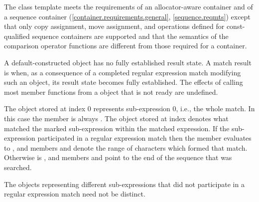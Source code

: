 \pnum
{}%
%
%
The class template  meets the requirements of an
allocator-aware container and of a sequence container
(\ref{container.requirements.general}, \ref{sequence.reqmts})
except that only
copy assignment,
move assignment, and
operations defined for const-qualified sequence containers
are supported and
that the semantics of the comparison operator functions are different from those
required for a container.

\pnum
A default-constructed  object has no fully established result state. A
match result is  when, as a consequence of a completed regular expression match
modifying such an object, its result state becomes fully established. The effects of calling
most member functions from a  object that is not ready are undefined.

\pnum
{}%
The  object stored at index 0 represents sub-expression 0,
i.e., the whole match. In this case the  member
 is always . The 
object stored at index  denotes what matched the marked
sub-expression  within the matched expression. If the
sub-expression  participated in a regular expression
match then the  member  evaluates to , and
members  and  denote the range of characters
 which formed that
match. Otherwise  is , and members 
and  point to the end of the sequence
that was searched.
\begin{note}
The  objects representing
different sub-expressions that did not participate in a regular expression
match need not be distinct.
\end{note}

